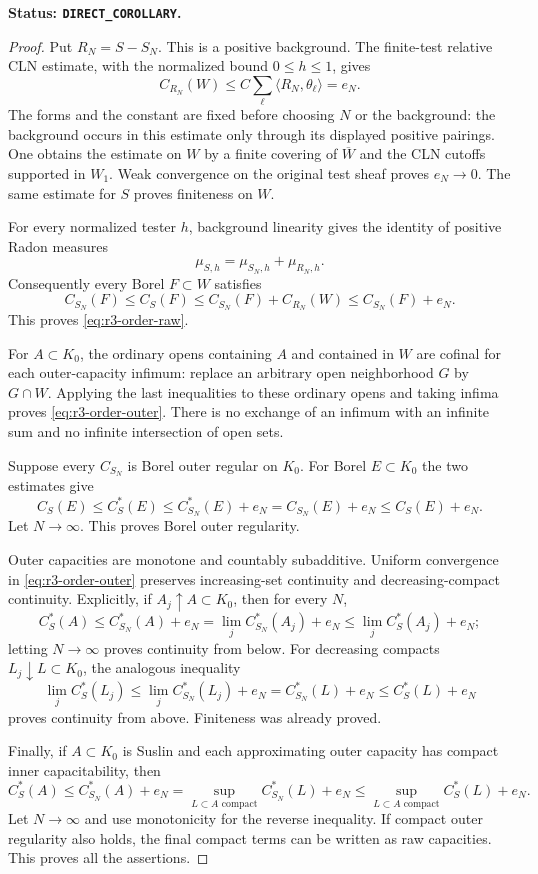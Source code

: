 \documentclass[11pt,a4paper]{article}
\numberwithin{equation}{section}
\theoremstyle{definition}
\theoremstyle{remark}
\begin{document}
\noindent\textbf{Status: \texttt{DIRECT\_COROLLARY}.}

\begin{proof}
Put $R_N=S-S_N$.  This is a positive background.  The finite-test
relative CLN estimate, with the normalized bound $0\leq h\leq1$,
gives
\begin{equation}
 C_{R_N}(W)
    \leq C\sum_\ell\langle R_N,\theta_\ell\rangle=e_N.
 \label{eq:r3-order-tail-cln}
\end{equation}
The forms and the constant are fixed before choosing $N$ or the
background: the background occurs in this estimate only through
its displayed positive pairings.  One obtains the estimate on $W$
by a finite covering of $\overline W$ and the CLN cutoffs supported
in $W_1$.  Weak convergence on the original test sheaf proves
$e_N\to0$.  The same estimate for $S$ proves finiteness on $W$.

For every normalized tester $h$, background linearity gives the
identity of positive Radon measures
\[
 \mu_{S,h}=\mu_{S_N,h}+\mu_{R_N,h}.
\]
Consequently every Borel $F\subset W$ satisfies
\[
 C_{S_N}(F)\leq C_S(F)
       \leq C_{S_N}(F)+C_{R_N}(W)
       \leq C_{S_N}(F)+e_N.
\]
This proves \eqref{eq:r3-order-raw}.

For $A\subset K_0$, the ordinary opens containing $A$ and contained
in $W$ are cofinal for each outer-capacity infimum: replace an
arbitrary open neighborhood $G$ by $G\cap W$.  Applying the last
inequalities to these ordinary opens and taking infima proves
\eqref{eq:r3-order-outer}.  There is no exchange of an infimum with
an infinite sum and no infinite intersection of open sets.

Suppose every $C_{S_N}$ is Borel outer regular on $K_0$.  For Borel
$E\subset K_0$ the two estimates give
\[
 C_S(E)\leq C_S^*(E)
       \leq C_{S_N}^*(E)+e_N
       =C_{S_N}(E)+e_N\leq C_S(E)+e_N.
\]
Let $N\to\infty$.  This proves Borel outer regularity.

Outer capacities are monotone and countably subadditive.  Uniform
convergence in \eqref{eq:r3-order-outer} preserves increasing-set
continuity and decreasing-compact continuity.  Explicitly, if
$A_j\uparrow A\subset K_0$, then for every $N$,
\[
 C_S^*(A)\leq C_{S_N}^*(A)+e_N
       =\lim_j C_{S_N}^*(A_j)+e_N
       \leq\lim_j C_S^*(A_j)+e_N;
\]
letting $N\to\infty$ proves continuity from below.  For decreasing
compacts $L_j\downarrow L\subset K_0$, the analogous inequality
\[
 \lim_j C_S^*(L_j)
       \leq\lim_j C_{S_N}^*(L_j)+e_N
       =C_{S_N}^*(L)+e_N\leq C_S^*(L)+e_N
\]
proves continuity from above.  Finiteness was already proved.

Finally, if $A\subset K_0$ is Suslin and each approximating outer
capacity has compact inner capacitability, then
\[
 C_S^*(A)\leq C_{S_N}^*(A)+e_N
       =\sup_{L\subset A\text{ compact}}C_{S_N}^*(L)+e_N
       \leq\sup_{L\subset A\text{ compact}}C_S^*(L)+e_N.
\]
Let $N\to\infty$ and use monotonicity for the reverse inequality.
If compact outer regularity also holds, the final compact terms can
be written as raw capacities.  This proves all the assertions.
\end{proof}
\end{document}
